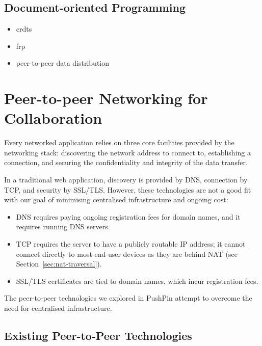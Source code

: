\documentclass[sigplan,10pt]{acmart}
\begin{document}
\subsection{Document-oriented Programming}
\begin{itemize}
    \item crdts
    \item frp
    \item peer-to-peer data distribution
\end{itemize}


\section{Peer-to-peer Networking for Collaboration}\label{sec:networking}

Every networked application relies on three core facilities provided by the networking stack: discovering the network address to connect to, establishing a connection, and securing the confidentiality and integrity of the data transfer.

In a traditional web application, discovery is provided by DNS, connection by TCP, and security by SSL/TLS.
However, these technologies are not a good fit with our goal of minimising centralised infrastructure and ongoing cost:
\begin{itemize}
    \item DNS requires paying ongoing registration fees for domain names, and it requires running DNS servers.
    \item TCP requires the server to have a publicly routable IP address; it cannot connect directly to most end-user devices as they are behind NAT (see Section~\ref{sec:nat-traversal}).
    \item SSL/TLS certificates are tied to domain names, which incur registration fees.
\end{itemize}

The peer-to-peer technologies we explored in PushPin attempt to overcome the need for centralised infrastructure.

\subsection{Existing Peer-to-Peer Technologies}
\end{document}
